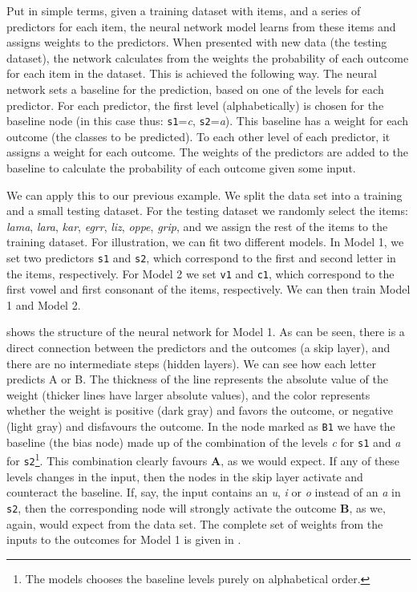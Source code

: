 Put in simple terms, given a training dataset with items, and a series of predictors for each item, the neural network model learns from these items and assigns weights to the predictors. When presented with new data (the testing dataset), the network calculates from the weights the probability of each outcome for each item in the dataset. This is achieved the following way. The neural network sets a baseline for the prediction, based on one of the levels for each predictor. For each predictor, the first level (alphabetically) is chosen for the baseline node (in this case thus: \texttt{s1}=\textit{c}, \texttt{s2}=\textit{a}). This baseline has a weight for each outcome (the classes to be predicted). To each other level of each predictor, it assigns a weight for each outcome. The weights of the predictors are added to the baseline to calculate the probability of each outcome given some input.

We can apply this to our previous example. We split the data set into a training and a small testing dataset. For the testing dataset we randomly select the items: \textit{lama}, \textit{lara}, \textit{kar}, \textit{egrr}, \textit{liz}, \textit{oppe}, \textit{grip}, and we assign the rest of the items to the training dataset. For illustration, we can fit two different models. In Model 1, we set two predictors \texttt{s1} and \texttt{s2}, which correspond to the first and second letter in the items, respectively. For Model 2 we set \texttt{v1} and \texttt{c1}, which correspond to the first vowel and first consonant of the items, respectively. We can then train Model 1 and Model 2.

 shows the structure of the neural network for Model 1. As can be seen, there is a direct connection between the predictors and the outcomes (a skip layer), and there are no intermediate steps (hidden layers). We can see how each letter predicts A or B. The thickness of the line represents the absolute value of the weight (thicker lines have larger absolute values), and the color represents whether the weight is positive (dark gray) and favors the outcome, or negative (light gray) and disfavours the outcome. In the node marked as \texttt{B1} we have the baseline (the bias node) made up of the combination of the levels \textit{c} for \texttt{s1} and \textit{a} for \texttt{s2}\footnote{The models chooses the baseline levels purely on alphabetical order.}. This combination clearly favours \textbf{A}, as we would expect. If any of these levels changes in the input, then the nodes in the skip layer activate and counteract the baseline. If, say, the input contains an \textit{u}, \textit{i} or \textit{o} instead of an \textit{a} in \texttt{s2}, then the corresponding node will strongly activate the outcome \textbf{B}, as we, again, would expect from the data set. The complete set of weights from the inputs to the outcomes for Model 1 is given in .

